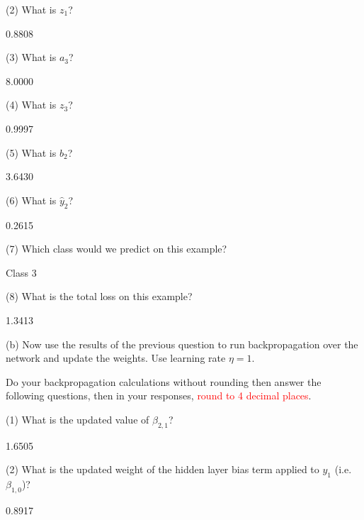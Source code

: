 (2) What is $z_1$?
\begin{tcolorbox}[fit,height=1cm, width=2cm, blank, borderline={1pt}{-2pt}]
    0.8808
\end{tcolorbox}

(3) What is $a_3$?
\begin{tcolorbox}[fit,height=1cm, width=2cm, blank, borderline={1pt}{-2pt}]
    8.0000
\end{tcolorbox}

(4) What is $z_3$?
\begin{tcolorbox}[fit,height=1cm, width=2cm, blank, borderline={1pt}{-2pt}]
    0.9997
\end{tcolorbox}

(5) What is $b_2$?
\begin{tcolorbox}[fit,height=1cm, width=2cm, blank, borderline={1pt}{-2pt}]
    3.6430
\end{tcolorbox}

(6) What is $\hat{y}_2$?
\begin{tcolorbox}[fit,height=1cm, width=2cm, blank, borderline={1pt}{-2pt}]
    0.2615
\end{tcolorbox}

(7) Which class would we predict on this example?
\begin{tcolorbox}[fit,height=1cm, width=2cm, blank, borderline={1pt}{-2pt}]
    Class 3
\end{tcolorbox}

(8) What is the total loss on this example?
\begin{tcolorbox}[fit,height=1cm, width=2cm, blank, borderline={1pt}{-2pt}]
    1.3413
\end{tcolorbox}



(b)  Now use the results of the previous question to run backpropagation over the network and update the weights. Use learning rate $\eta=1$.

Do your backpropagation calculations without rounding then answer the following questions, then in your responses, \textcolor{red}{round to 4 decimal places}.

(1) What is the updated value of ${\beta}_{2,1}$?
\begin{tcolorbox}[fit,height=1cm, width=2cm, blank, borderline={1pt}{-2pt}]
    1.6505
\end{tcolorbox}

(2) What is the updated weight of the hidden layer bias term applied to $y_1$ (i.e. ${\beta}_{1,0}$)?
\begin{tcolorbox}[fit,height=1cm, width=2cm, blank, borderline={1pt}{-2pt}]
    0.8917
\end{tcolorbox}

